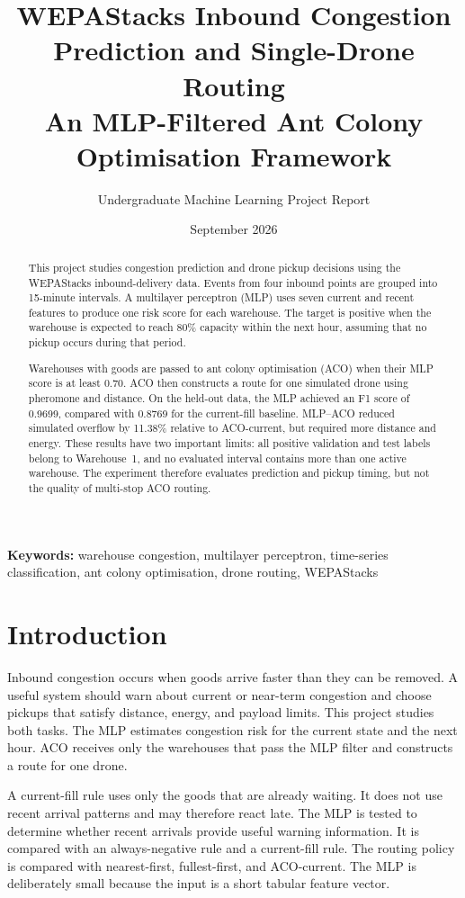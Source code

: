 \documentclass[10pt]{article}
\title{\textbf{WEPAStacks Inbound Congestion Prediction and Single-Drone Routing}\\[0.45em]
\large An MLP-Filtered Ant Colony Optimisation Framework}
\author{Undergraduate Machine Learning Project Report}
\date{September 2026}
\begin{document}
\maketitle

\begin{abstract}
This project studies congestion prediction and drone pickup decisions using the WEPAStacks inbound-delivery data. Events from four inbound points are grouped into 15-minute intervals. A multilayer perceptron (MLP) uses seven current and recent features to produce one risk score for each warehouse. The target is positive when the warehouse is expected to reach 80\% capacity within the next hour, assuming that no pickup occurs during that period.

Warehouses with goods are passed to ant colony optimisation (ACO) when their MLP score is at least 0.70. ACO then constructs a route for one simulated drone using pheromone and distance. On the held-out data, the MLP achieved an F1 score of 0.9699, compared with 0.8769 for the current-fill baseline. MLP--ACO reduced simulated overflow by 11.38\% relative to ACO-current, but required more distance and energy. These results have two important limits: all positive validation and test labels belong to Warehouse~1, and no evaluated interval contains more than one active warehouse. The experiment therefore evaluates prediction and pickup timing, but not the quality of multi-stop ACO routing.
\end{abstract}

\textbf{Keywords:} warehouse congestion, multilayer perceptron, time-series classification, ant colony optimisation, drone routing, WEPAStacks

\tableofcontents
\newpage

\section{Introduction}

Inbound congestion occurs when goods arrive faster than they can be removed. A useful system should warn about current or near-term congestion and choose pickups that satisfy distance, energy, and payload limits. This project studies both tasks. The MLP estimates congestion risk for the current state and the next hour. ACO receives only the warehouses that pass the MLP filter and constructs a route for one drone.

A current-fill rule uses only the goods that are already waiting. It does not use recent arrival patterns and may therefore react late. The MLP is tested to determine whether recent arrivals provide useful warning information. It is compared with an always-negative rule and a current-fill rule. The routing policy is compared with nearest-first, fullest-first, and ACO-current. The MLP is deliberately small because the input is a short tabular feature vector.
\end{document}
